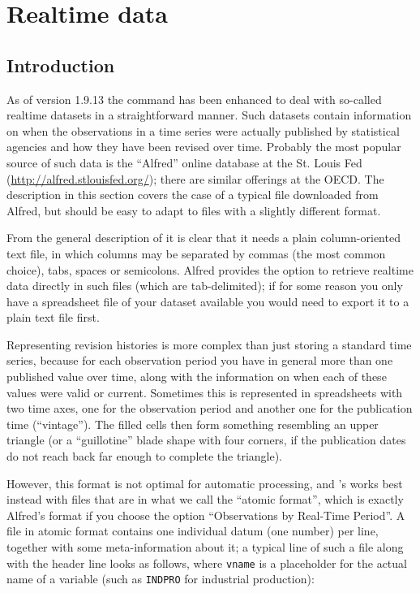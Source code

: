 \chapter{Realtime data}
\label{chap:realtime}

\section{Introduction}
\label{sec:realtime-intro}

As of  version 1.9.13 the  command has been
enhanced to deal with so-called realtime datasets in a straightforward
manner.  Such datasets contain information on when the observations in
a time series were actually published by statistical agencies and how
they have been revised over time. Probably the most popular source of
such data is the ``Alfred'' online database at the St. Louis Fed
(\url{http://alfred.stlouisfed.org/}); there are similar offerings at
the OECD.  The description in this section covers the case of a
typical file downloaded from Alfred, but should be easy to adapt to
files with a slightly different format.

From the general description of  it is clear that it needs a
plain column-oriented text file, in which columns may be separated by
commas (the most common choice), tabs, spaces or semicolons. Alfred
provides the option to retrieve realtime data directly in such files
(which are tab-delimited); if for some reason you only have a
spreadsheet file of your dataset available you would need to export it
to a plain text file first.

Representing revision histories is more complex than just storing a
standard time series, because for each observation period you have in
general more than one published value over time, along with the
information on when each of these values were valid or
current. Sometimes this is represented in spreadsheets with two time
axes, one for the observation period and another one for the
publication time (``vintage''). The filled cells then form something
resembling an upper triangle (or a ``guillotine'' blade shape with
four corners, if the publication dates do not reach back far enough to
complete the triangle).

However, this format is not optimal for automatic processing, and
's  works best instead with files that are in
what we call the ``atomic format'', which is exactly Alfred's format
if you choose the option ``Observations by Real-Time Period''. A file
in atomic format contains one individual datum (one number) per line,
together with some meta-information about it; a typical line of such a
file along with the header line looks as follows, where \texttt{vname} is a
placeholder for the actual name of a variable (such as \texttt{INDPRO}
for industrial production):

